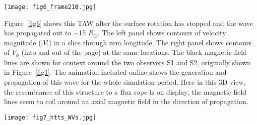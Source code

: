 \documentclass[preprint]{aastex62}
\begin{document}
\begin{figure*}
	\centerline{ \texttt{[image: fig6\_frame210.jpg]} }
	\caption{Longitudinal cut at $\phi = 0$ of $|V|$ (left) and
	$V_\phi$ (right) showing the TAW propagating through the S1 (red), S2 (light
	blue) observation points. Representative surrounding magnetic field lines are 
	also shown in black to illustrate the ``pseudo-flux rope'' structure of the TAW.
	\\ (An animation of this figure is available) \\}
	\label{fig6}
\end{figure*}


Figure~\ref{fig6} shows this TAW after the surface rotation has
stopped and the wave has propagated out to $\sim$15 $R_\odot$. The
left panel shows contours of velocity magnitude ($|V|$) in a slice
through zero longitude. The right panel shows contours of $V_\phi$
(into and out of the page) at the same locations. The black magnetic
field lines are shown for context around the two observers S1 and
S2, originally shown in Figure~\ref{fig1}.  The animation included
online shows the generation and propagation of this wave for the
whole simulation period. Here in this 3D view, the resemblance of
this structure to a flux rope is on display; the magnetic field
lines seem to coil around an axial magnetic field in the direction
of propagation.



\begin{figure*}
	\centerline{ \texttt{[image: fig7\_htts\_WVs.jpg]} }
	\caption{The full time series of $N_p$, $\beta$, $\boldsymbol{V}$,
	$\boldsymbol{B}$ at S1 (black) and S2 (green) observation points. 
	The height-time J-map plot through S1 of ${|V|}$ shows the radial 
	propagation and evolution
	of the large-scale TAW.\\}
	\label{fig7}
\end{figure*}
\end{document}
